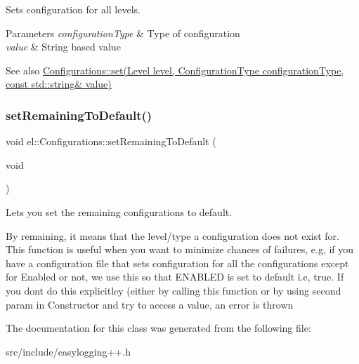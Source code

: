 Sets configuration for all levels. 


\begin{DoxyParams}{Parameters}
{\em configuration\+Type} & Type of configuration \\
\hline
{\em value} & String based value \\
\hline
\end{DoxyParams}
\begin{DoxySeeAlso}{See also}
\hyperlink{classel_1_1_configurations_a332717de96efc851a202b7afcc5e395c}{Configurations\+::set(\+Level level, Configuration\+Type configuration\+Type, const std\+::string\& value)} 
\end{DoxySeeAlso}
\mbox{\label{classel_1_1_configurations_ad89b7d2dd750e4d1b3deff800e278fdb}} 
\subsubsection{\texorpdfstring{set\+Remaining\+To\+Default()}{setRemainingToDefault()}}
{\footnotesize\ttfamily void el\+::\+Configurations\+::set\+Remaining\+To\+Default (\begin{DoxyParamCaption}\item[{void}]{ }\end{DoxyParamCaption})\hspace{0.3cm}{\ttfamily [inline]}}



Lets you set the remaining configurations to default. 

By remaining, it means that the level/type a configuration does not exist for. This function is useful when you want to minimize chances of failures, e.\+g, if you have a configuration file that sets configuration for all the configurations except for Enabled or not, we use this so that E\+N\+A\+B\+L\+ED is set to default i.\+e, true. If you dont do this explicitley (either by calling this function or by using second param in Constructor and try to access a value, an error is thrown 

The documentation for this class was generated from the following file\+:\begin{DoxyCompactItemize}
\item 
src/include/easylogging++.\+h\end{DoxyCompactItemize}
